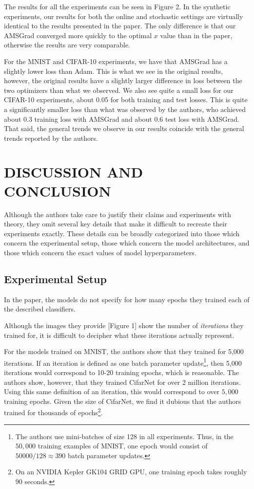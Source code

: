 \documentclass[letterpaper, 10 pt, conference]{ieeeconf}  %
\begin{document}
The results for all the experiments can be seen in Figure 2. In the synthetic experiments, our results for both the online and stochastic settings are virtually identical to the results presented in the paper. The only difference is that our AMSGrad converged more quickly to the optimal $x$ value than in the paper, otherwise the results are very comparable.

For the MNIST and CIFAR-10 experiments, we have that AMSGrad has a slightly lower loss than Adam. This is what we see in the original results, however, the original results have a slightly larger difference in loss between the two optimizers than what we observed. We also see quite a small loss for our CIFAR-10 experiments, about 0.05 for both training and test losses. This is quite a significantly smaller loss than what was observed by the authors, who achieved about 0.3 training loss with AMSGrad and about 0.6 test loss with AMSGrad. That said, the general trends we observe in our results coincide with the general trends reported by the authors. 

\section{DISCUSSION AND CONCLUSION}

Although the authors take care to justify their claims and experiments with theory, they omit several key details that make it difficult to recreate their experiments exactly. These details can be broadly categorized into those which concern the experimental setup, those which concern the model architectures, and those which concern the exact values of model hyperparameters. 

\subsection{Experimental Setup}

In the paper, the models do not specify for how many epochs they trained each of the described classifiers.

Although the images they provide [Figure 1] show the number of \emph{iterations} they trained for, it is difficult to decipher what these iterations actually represent. 

For the models trained on MNIST, the authors show that they trained for 5,000 iterations. If an iteration is defined as one batch parameter update\footnote{The authors use mini-batches of size 128 in all experiments. Thus, in the $50,000$ training examples of MNIST, one epoch would consist of $50000/128 \approx 390$ batch parameter updates.}, then 5,000 iterations would correspond to 10-20 training epochs, which is reasonable. The authors show, however, that they trained CifarNet for over 2 million iterations. Using this same definition of an iteration, this would correspond to over $5,000$ training epochs. Given the size of CifarNet, we find it dubious that the authors trained for thousands of epochs\footnote{On an NVIDIA Kepler GK104 GRID GPU, one training epoch takes roughly 90 seconds.}.
\end{document}
